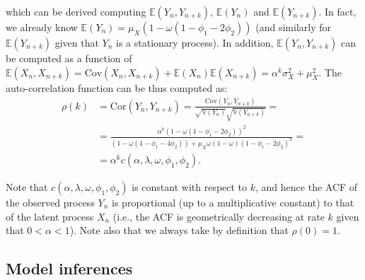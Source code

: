 \documentclass[Afour,sageh,times]{sagej}
\begin{document}
which can be derived computing $\mathbb{E}(Y_n,Y_{n+k})$, $\mathbb{E}(Y_n)$ and $\mathbb{E}(Y_{n+k})$. In fact, we already know $\mathbb{E}(Y_n)=\mu_X(1-\omega(1-\phi_1-2\phi_2))$ (and similarly for $\mathbb{E}(Y_{n+k})$ given that $Y_n$ is a stationary process). In addition, $\mathbb{E}(Y_n,Y_{n+k})$ can be computed as a function of $\mathbb{E}(X_n,X_{n+k})=\textrm{Cov}(X_n,X_{n+k})+\mathbb{E}(X_n)\mathbb{E}(X_{n+k})=\alpha^k\sigma_X^2+\mu_X^2$. The auto-correlation function can be thus computed as:
\begin{align}
\rho(k)&=\textrm{Cor}\left(Y_n,Y_{n+k}\right)=\frac{\textrm{Cov}(Y_n,Y_{n+k})}{\sqrt{\mathbb{V}(Y_n)}\sqrt{\mathbb{V}(Y_{n+k})}}=\\&=\frac{\alpha^k\left(1-\omega\left(1-\phi_1-2\phi_2\right)\right)^2}{(1-\omega (1-\phi_1-4\phi_2))+\mu_X\omega(1-\omega)(1-\phi_1-2\phi_2)^2} = \nonumber \\ &= \alpha^k c(\alpha,\lambda,\omega,\phi_1,\phi_2). \nonumber 
\end{align}

Note that $c(\alpha,\lambda,\omega,\phi_1,\phi_2)$ is constant with respect to $k$, and hence the ACF of the observed process $Y_n$ is proportional (up to a multiplicative constant) to that of the latent process $X_n$ (i.e., the ACF is geometrically decreasing at rate $k$ given that $0<\alpha<1$). Note also that we always take by definition that $\rho(0)=1$.

\subsection{Model inferences}
\end{document}
